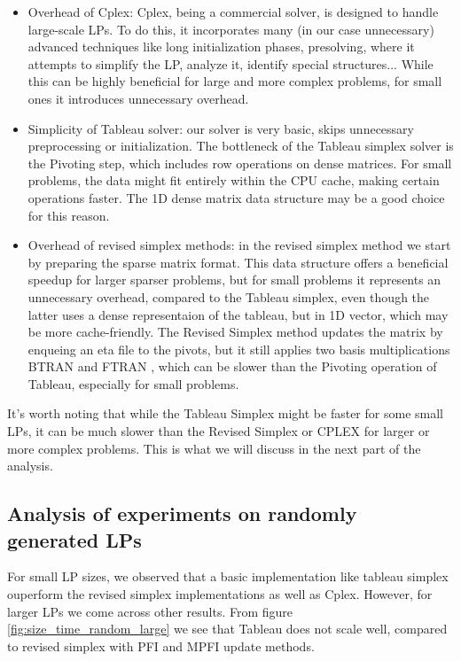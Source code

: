 \begin{itemize}
    \item Overhead of Cplex: Cplex, being a commercial solver, is designed to handle
    large-scale LPs. To do this, it incorporates many (in our case unnecessary) advanced techniques like 
    long initialization phases, presolving,
    where it attempts to simplify the LP, analyze it, identify special structures... While
    this can be highly beneficial for large and more complex problems, for small ones it 
    introduces unnecessary overhead.
    \item Simplicity of Tableau solver: our solver is very basic, skips unnecessary
    preprocessing or initialization. The bottleneck of the Tableau simplex solver
    is the Pivoting step, which includes row operations on dense matrices.
    For small problems, the data might fit entirely within the CPU cache, 
    making certain operations faster. The 1D dense matrix data structure may be a good 
    choice for this reason.
    \item Overhead of revised simplex methods: in the revised simplex method we start by
    preparing the sparse matrix format. This data structure offers a beneficial speedup 
    for larger sparser problems, but for small problems it represents an unnecessary 
    overhead, compared to the Tableau simplex, even though the latter uses a dense 
    representaion of the tableau, but in 1D vector, which may be more cache-friendly.
    The Revised Simplex method updates the matrix by enqueing an eta file to the pivots,
    but it still applies two basis multiplications BTRAN and FTRAN
    , which can be slower than the Pivoting operation of Tableau, especially for
     small problems.

\end{itemize}

It's worth noting that while the Tableau Simplex might be faster for some small LPs, 
it can be 
much slower than the Revised Simplex or CPLEX for larger or more complex problems. 
This is what we will discuss in  the next part of the analysis.

\subsection{Analysis of experiments on randomly generated LPs}
For small LP sizes, we observed that a basic implementation like tableau simplex
ouperform the revised simplex implementations as well as Cplex. However, for
larger LPs we come across other results. 
From figure \ref{fig:size_time_random_large} we see that Tableau does not scale well,
compared to revised simplex with PFI and MPFI update methods.

